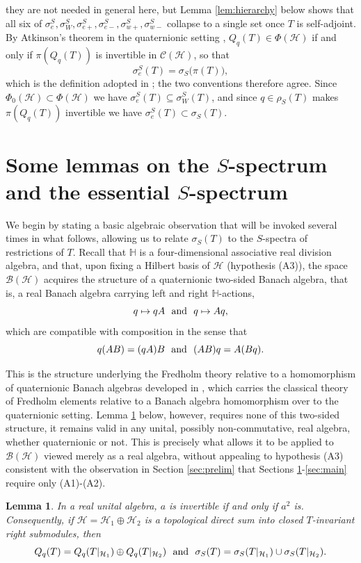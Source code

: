 \documentclass[12pt,a4paper]{article}
\theoremstyle{plain}
\newtheorem{lemma}[theorem]{Lemma}
\theoremstyle{definition}
\theoremstyle{remark}
\newcommand{\HH}{\mathbb H}
\newcommand{\BB}{\mathcal B}
\newcommand{\Calk}{\mathcal C}
\newcommand{\HS}{\mathcal H}
\newcommand{\sigS}{\sigma_S}
\newcommand{\sigeS}{\sigma_{e}^{S}}
\newcommand{\sigwS}{\sigma_{W}^{S}}
\newcommand{\sigeuS}{\sigma_{e+}^{S}}
\newcommand{\sigedS}{\sigma_{e-}^{S}}
\newcommand{\sigwuS}{\sigma_{w+}^{S}}
\newcommand{\sigwdS}{\sigma_{w-}^{S}}
\newcommand{\rhoS}{\rho_S}
\begin{document}
{they are not needed in general here, but Lemma \ref{lem:hierarchy}
below shows that all six of
$\sigeS,\sigwS,\sigeuS,\sigedS,\sigwuS,\sigwdS$ collapse to a single
set once $T$ is self-adjoint. By Atkinson's theorem in the
quaternionic setting
\cite{MuraleetharanThirulogasanthar2018}, $Q_q(T)\in\Phi(\HS)$ if and
only if $\pi(Q_q(T))$ is invertible in $\Calk(\HS)$, so that
\begin{equation}
 \sigeS(T)=\sigS\big(\pi(T)\big),
 \label{eq:calkin}
\end{equation}
which is the definition adopted in
\cite{Baloudi2020,MuraleetharanThirulogasanthar2018}; the two
conventions therefore agree. Since $\Phi_0(\HS)\subset\Phi(\HS)$ we
have $\sigeS(T)\subseteq\sigwS(T)$, and since $q\in\rhoS(T)$ makes
$\pi(Q_q(T))$ invertible we have $\sigeS(T)\subset\sigS(T)$.

\section{Some lemmas on the $S$-spectrum and the essential $S$-spectrum}
\label{sec:fredholm}

We begin by stating a basic algebraic observation that will be invoked
several times in what follows, allowing us to relate $\sigS(T)$ to the
$S$-spectra of restrictions of $T$. Recall that $\HH$ is a
four-dimensional associative real division algebra, and that, upon
fixing a Hilbert basis of $\HS$ (hypothesis (A3)), the space
$\BB(\HS)$ acquires the structure of a quaternionic two-sided
Banach algebra, that is, a real Banach algebra carrying left and right
$\HH$-actions, $$q\mapsto qA ~~\hbox{and}~~ q\mapsto Aq,$$ which are compatible
with composition in the sense that $$q(AB)=(qA)B ~~\hbox{and}~~(AB)q=A(Bq).$$


This is the structure underlying the Fredholm theory relative to a
homomorphism of quaternionic Banach algebras developed in
\cite{BaloudiFredholm2022}, which carries the classical theory of
Fredholm elements relative to a Banach algebra homomorphism over to the
quaternionic setting. Lemma \ref{lem:square} below, however, requires
none of this two-sided structure, it remains valid in any unital,
possibly non-commutative, real algebra, whether quaternionic or not.
This is precisely what allows it to be applied to $\BB(\HS)$ viewed
merely as a real algebra, without appealing to hypothesis (A3)
consistent with the observation in Section \ref{sec:prelim} that
Sections \ref{sec:fredholm}-\ref{sec:main} require only (A1)-(A2).
\begin{lemma}
\label{lem:square}
In a real unital algebra, $a$ is invertible if and only if $a^2$ is.
Consequently, if $\HS=\HS_1\oplus\HS_2$ is a topological direct sum
into closed $T$-invariant right submodules, then
$$Q_q(T)=Q_q(T|_{\HS_1})\oplus Q_q(T|_{\HS_2}) ~~\hbox{and}~~ \sigS(T)=\sigS(T|_{\HS_1})\cup\sigS(T|_{\HS_2}).$$
\end{lemma}

}
\end{document}
